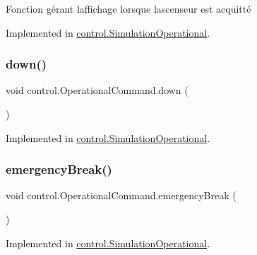 Fonction gérant l\textquotesingle{}affichage lorsque l\textquotesingle{}ascenseur est acquitté 

Implemented in \mbox{\hyperlink{classcontrol_1_1_simulation_operational_a66881a9f2cf8526dee93b756f8ad47af}{control.\+Simulation\+Operational}}.

\mbox{\label{interfacecontrol_1_1_operational_command_a3d1ecf1ec7ad55a3f3e02d2fc9df7e18}} 
\subsubsection{\texorpdfstring{down()}{down()}}
{\footnotesize\ttfamily void control.\+Operational\+Command.\+down (\begin{DoxyParamCaption}{ }\end{DoxyParamCaption})}



Implemented in \mbox{\hyperlink{classcontrol_1_1_simulation_operational_a67c7dc0ec1b837a8174d127cb6803eb9}{control.\+Simulation\+Operational}}.

\mbox{\label{interfacecontrol_1_1_operational_command_a63858b26e71770bb4ae232277d54b8a6}} 
\subsubsection{\texorpdfstring{emergencyBreak()}{emergencyBreak()}}
{\footnotesize\ttfamily void control.\+Operational\+Command.\+emergency\+Break (\begin{DoxyParamCaption}{ }\end{DoxyParamCaption})}



Implemented in \mbox{\hyperlink{classcontrol_1_1_simulation_operational_a1d385c1f369eb3aff538c36b5947f8ed}{control.\+Simulation\+Operational}}.

\mbox{\label{interfacecontrol_1_1_operational_command_a148c09334384843727fb7b1665252ff1}} 

